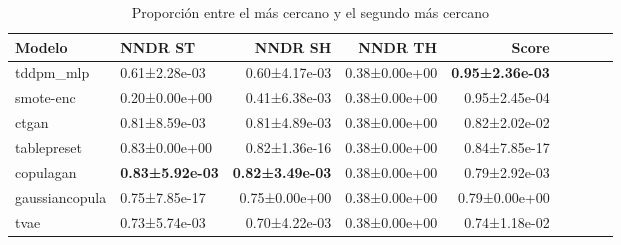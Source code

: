 \begin{table}[H]
\centering
\fontsize{10}{14}\selectfont
\caption{Proporción entre el más cercano y el segundo más cercano}
\label{table-dcr-king county-a}
\begin{tabular}{|l|l|r|r|r|r|r|r|r|}
\hline
\rowcolor[gray]{0.8}
Modelo & NNDR ST & NNDR SH & NNDR TH & \textbf{Score} \\
\hline tddpm\_mlp & 0.61±2.28e-03 & 0.60±4.17e-03 & 0.38±0.00e+00 & \bfseries 0.95±2.36e-03 \\
\hline smote-enc & \cellcolor[rgb]{0.9, 0.54, 0.52} 0.20±0.00e+00 & \cellcolor[rgb]{0.9, 0.54, 0.52} 0.41±6.38e-03 & 0.38±0.00e+00 & 0.95±2.45e-04 \\
\hline ctgan & 0.81±8.59e-03 & 0.81±4.89e-03 & 0.38±0.00e+00 & 0.82±2.02e-02 \\
\hline tablepreset & 0.83±0.00e+00 & 0.82±1.36e-16 & 0.38±0.00e+00 & 0.84±7.85e-17 \\
\hline copulagan & \bfseries 0.83±5.92e-03 & \bfseries 0.82±3.49e-03 & 0.38±0.00e+00 & 0.79±2.92e-03 \\
\hline gaussiancopula & 0.75±7.85e-17 & 0.75±0.00e+00 & 0.38±0.00e+00 & 0.79±0.00e+00 \\
\hline tvae & 0.73±5.74e-03 & 0.70±4.22e-03 & 0.38±0.00e+00 & \cellcolor[rgb]{0.9, 0.54, 0.52} 0.74±1.18e-02 \\
\hline
\end{tabular}
\end{table}
